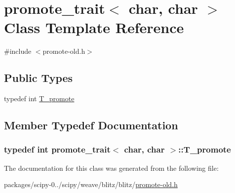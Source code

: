 \hypertarget{classpromote__trait_3_01char_00_01char_01_4}{}\section{promote\+\_\+trait$<$ char, char $>$ Class Template Reference}
\label{classpromote__trait_3_01char_00_01char_01_4}


{\ttfamily \#include $<$promote-\/old.\+h$>$}

\subsection*{Public Types}
\begin{DoxyCompactItemize}
\item 
typedef int \hyperlink{classpromote__trait_3_01char_00_01char_01_4_a164157b2b49c7fe5ad71f1d98da4ca1e}{T\+\_\+promote}
\end{DoxyCompactItemize}


\subsection{Member Typedef Documentation}
\hypertarget{classpromote__trait_3_01char_00_01char_01_4_a164157b2b49c7fe5ad71f1d98da4ca1e}{}
\subsubsection[{T\+\_\+promote}]{\setlength{\rightskip}{0pt plus 5cm}typedef int {\bf promote\+\_\+trait}$<$ char, char $>$\+::{\bf T\+\_\+promote}}\label{classpromote__trait_3_01char_00_01char_01_4_a164157b2b49c7fe5ad71f1d98da4ca1e}


The documentation for this class was generated from the following file\+:\begin{DoxyCompactItemize}
\item 
packages/scipy-\/0../scipy/weave/blitz/blitz/\hyperlink{promote-old_8h}{promote-\/old.\+h}\end{DoxyCompactItemize}
